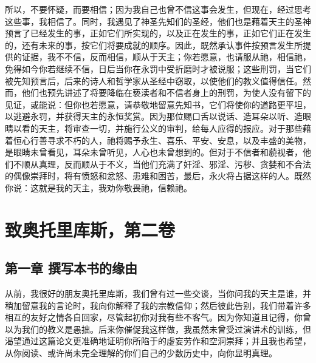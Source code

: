 所以，不要怀疑，而要相信；因为我自己也曾不信这事会发生，但现在，经过思考这些事，我相信了。同时，我遇见了神圣先知们的圣经，他们也是藉着天主的圣神预言了已经发生的事，正如它们所实现的，以及正在发生的事，正如它们正在发生的，还有未来的事，按它们将要成就的顺序。因此，既然承认事件按预言发生所提供的证据，我不不信，反而相信，顺从于天主；你若愿意，也请服从祂，相信祂，免得如今你若继续不信，日后当你在永罚中受折磨时才被说服；这些刑罚，当它们被先知预言后，后来的诗人和哲学家从圣经中窃取，以使他们的教义值得信任。然而，他们也预先讲述了将要降临在亵渎者和不信者身上的刑罚，为使人没有留下的见证，或能说：但你也若愿意，请恭敬地留意先知书，它们将使你的道路更平坦，以逃避永罚，并获得天主的永恒奖赏。因为那位赐口舌以说话、造耳朵以听、造眼睛以看的天主，将审查一切，并施行公义的审判，给每人应得的报应。对于那些藉着恒心行善寻求不朽的人，祂将赐予永生、喜乐、平安、安息，以及丰盛的美物，是眼睛未曾看见，耳朵未曾听见，人心也未曾想到的。但对于不信者和藐视者，他们不顺从真理，反而顺从于不义，当他们充满了奸淫、邪淫、污秽、贪婪和不合法的偶像崇拜时，将有愤怒和忿怒、患难和困苦，最后，永火将占据这样的人。既然你说：这就是我的天主，我劝你敬畏祂，信赖祂。\par



\section{致奥托里库斯，第二卷}


\subsection{第一章 撰写本书的缘由}

从前，我很好的朋友奥托里库斯，我们曾有过一些交谈，当你问我的天主是谁，并稍加留意我的言论时，我向你解释了我的宗教信仰；然后彼此告别，我们带着许多相互的友好之情各自回家，尽管起初你对我有些不客气。因为你知道且记得，你曾以为我们的教义是愚拙。后来你催促我这样做，我虽然未曾受过演讲术的训练，但渴望通过这篇论文更准确地证明你所陷于的虚妄劳作和空洞崇拜；并且我也希望，从你阅读、或许尚未完全理解的你们自己的少数历史中，向你显明真理。\par

